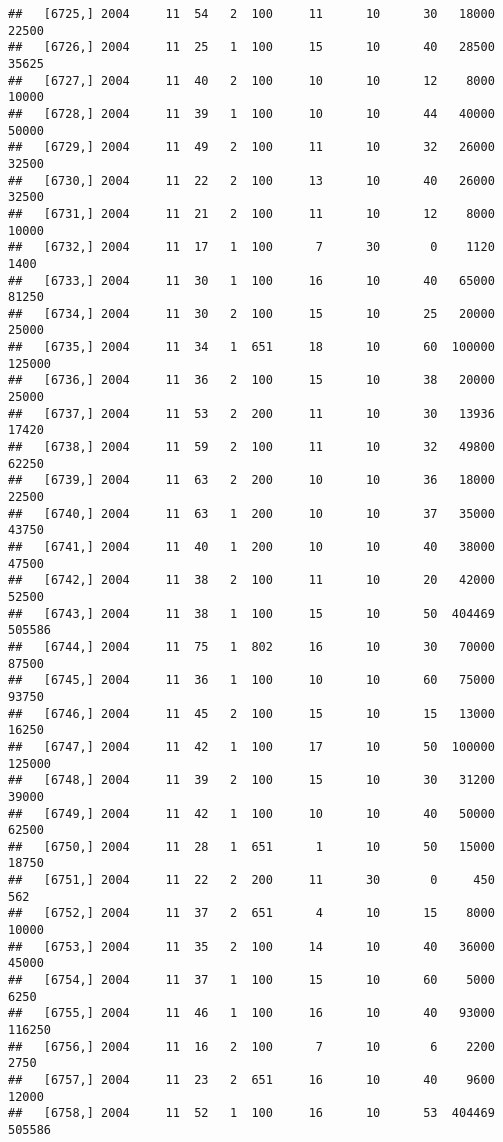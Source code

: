 \documentclass{article}\usepackage[]{graphicx}\usepackage[]{color}
\makeatletter
\newenvironment{kframe}{%
 \def\at@end@of@kframe{}%
 \ifinner\ifhmode%
  \def\at@end@of@kframe{\end{minipage}}%
  \begin{minipage}{\columnwidth}%
 \fi\fi%
 \def\FrameCommand##1{\hskip\@totalleftmargin \hskip-\fboxsep
 \colorbox{shadecolor}{##1}\hskip-\fboxsep
     \hskip-\linewidth \hskip-\@totalleftmargin \hskip\columnwidth}%
 \MakeFramed {\advance\hsize-\width
   \@totalleftmargin\z@ \linewidth\hsize
   \@setminipage}}%
 {\par\unskip\endMakeFramed%
 \at@end@of@kframe}
\newenvironment{knitrout}{}{} %
\makeatother
\begin{document}
\begin{knitrout}
\begin{kframe}
\begin{verbatim}
##   [6725,] 2004     11  54   2  100     11      10      30   18000   22500
##   [6726,] 2004     11  25   1  100     15      10      40   28500   35625
##   [6727,] 2004     11  40   2  100     10      10      12    8000   10000
##   [6728,] 2004     11  39   1  100     10      10      44   40000   50000
##   [6729,] 2004     11  49   2  100     11      10      32   26000   32500
##   [6730,] 2004     11  22   2  100     13      10      40   26000   32500
##   [6731,] 2004     11  21   2  100     11      10      12    8000   10000
##   [6732,] 2004     11  17   1  100      7      30       0    1120    1400
##   [6733,] 2004     11  30   1  100     16      10      40   65000   81250
##   [6734,] 2004     11  30   2  100     15      10      25   20000   25000
##   [6735,] 2004     11  34   1  651     18      10      60  100000  125000
##   [6736,] 2004     11  36   2  100     15      10      38   20000   25000
##   [6737,] 2004     11  53   2  200     11      10      30   13936   17420
##   [6738,] 2004     11  59   2  100     11      10      32   49800   62250
##   [6739,] 2004     11  63   2  200     10      10      36   18000   22500
##   [6740,] 2004     11  63   1  200     10      10      37   35000   43750
##   [6741,] 2004     11  40   1  200     10      10      40   38000   47500
##   [6742,] 2004     11  38   2  100     11      10      20   42000   52500
##   [6743,] 2004     11  38   1  100     15      10      50  404469  505586
##   [6744,] 2004     11  75   1  802     16      10      30   70000   87500
##   [6745,] 2004     11  36   1  100     10      10      60   75000   93750
##   [6746,] 2004     11  45   2  100     15      10      15   13000   16250
##   [6747,] 2004     11  42   1  100     17      10      50  100000  125000
##   [6748,] 2004     11  39   2  100     15      10      30   31200   39000
##   [6749,] 2004     11  42   1  100     10      10      40   50000   62500
##   [6750,] 2004     11  28   1  651      1      10      50   15000   18750
##   [6751,] 2004     11  22   2  200     11      30       0     450     562
##   [6752,] 2004     11  37   2  651      4      10      15    8000   10000
##   [6753,] 2004     11  35   2  100     14      10      40   36000   45000
##   [6754,] 2004     11  37   1  100     15      10      60    5000    6250
##   [6755,] 2004     11  46   1  100     16      10      40   93000  116250
##   [6756,] 2004     11  16   2  100      7      10       6    2200    2750
##   [6757,] 2004     11  23   2  651     16      10      40    9600   12000
##   [6758,] 2004     11  52   1  100     16      10      53  404469  505586

\end{verbatim}
\end{kframe}
\end{knitrout}
\end{document}
